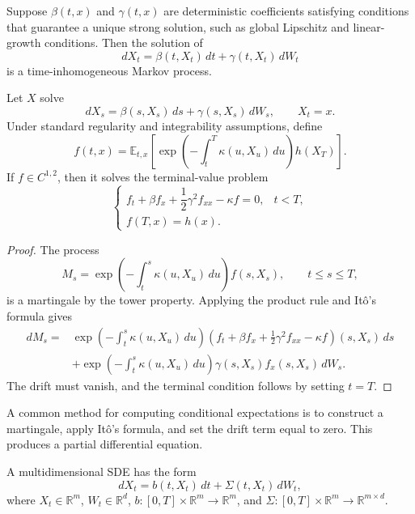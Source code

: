 \begin{thm}
Suppose $\beta(t,x)$ and $\gamma(t,x)$ are deterministic coefficients satisfying conditions that guarantee a unique strong solution, such as global Lipschitz and linear-growth conditions. Then the solution of
\[
dX_t=\beta(t,X_t)\,dt+\gamma(t,X_t)\,dW_t
\]
is a time-inhomogeneous Markov process.
\end{thm}

\begin{thm}
Let $X$ solve
\[
dX_s=\beta(s,X_s)\,ds+\gamma(s,X_s)\,dW_s,
\qquad X_t=x.
\]
Under standard regularity and integrability assumptions, define
\[
f(t,x)
=
\mathbb{E}_{t,x}\left[
\exp\left(-\int_t^T\kappa(u,X_u)\,du\right)
 h(X_T)
\right].
\]
If $f\in C^{1,2}$, then it solves the terminal-value problem
\[
\begin{cases}
 f_t+\beta f_x+\dfrac12\gamma^2 f_{xx}-\kappa f=0,
 &t<T,\\[0.8ex]
 f(T,x)=h(x).
\end{cases}
\]
\end{thm}

\begin{proof}
The process
\[
M_s
=
\exp\left(-\int_t^s\kappa(u,X_u)\,du\right)f(s,X_s),
\qquad t\leq s\leq T,
\]
is a martingale by the tower property. Applying the product rule and It\^o's formula gives
\[
\begin{aligned}
dM_s
={}&
\exp\left(-\int_t^s\kappa(u,X_u)\,du\right)
\left(
 f_t+\beta f_x+\frac12\gamma^2f_{xx}-\kappa f
\right)(s,X_s)\,ds\\
&+
\exp\left(-\int_t^s\kappa(u,X_u)\,du\right)
\gamma(s,X_s)f_x(s,X_s)\,dW_s.
\end{aligned}
\]
The drift must vanish, and the terminal condition follows by setting $t=T$.
\end{proof}

\begin{remark}
A common method for computing conditional expectations is to construct a martingale, apply It\^o's formula, and set the drift term equal to zero. This produces a partial differential equation.
\end{remark}

\begin{de}
A multidimensional SDE has the form
\[
dX_t=b(t,X_t)\,dt+\Sigma(t,X_t)\,dW_t,
\]
where $X_t\in\mathbb{R}^m$, $W_t\in\mathbb{R}^d$, $b:[0,T]\times\mathbb{R}^m\to\mathbb{R}^m$, and $\Sigma:[0,T]\times\mathbb{R}^m\to\mathbb{R}^{m\times d}$.
\end{de}

